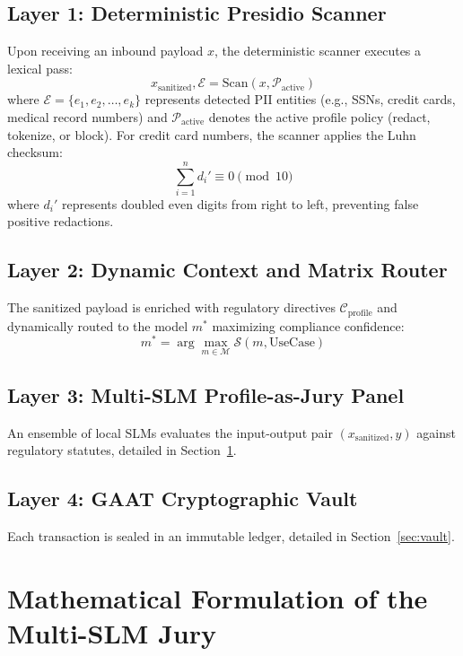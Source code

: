 \documentclass[conference,10pt]{IEEEtran}
\begin{document}
\subsection{Layer 1: Deterministic Presidio Scanner}
Upon receiving an inbound payload $x$, the deterministic scanner executes a lexical pass:
\begin{equation}
    x_{\text{sanitized}}, \mathcal{E} = \text{Scan}(x, \mathcal{P}_{\text{active}})
\end{equation}
where $\mathcal{E} = \{e_1, e_2, \dots, e_k\}$ represents detected PII entities (e.g., SSNs, credit cards, medical record numbers) and $\mathcal{P}_{\text{active}}$ denotes the active profile policy (redact, tokenize, or block). For credit card numbers, the scanner applies the Luhn checksum:
\begin{equation}
    \sum_{i=1}^{n} d_i' \equiv 0 \pmod{10}
\end{equation}
where $d_i'$ represents doubled even digits from right to left, preventing false positive redactions.

\subsection{Layer 2: Dynamic Context and Matrix Router}
The sanitized payload is enriched with regulatory directives $\mathcal{C}_{\text{profile}}$ and dynamically routed to the model $m^*$ maximizing compliance confidence:
\begin{equation}
    m^* = \arg\max_{m \in \mathcal{M}} \mathcal{S}(m, \text{UseCase})
\end{equation}

\subsection{Layer 3: Multi-SLM Profile-as-Jury Panel}
An ensemble of local SLMs evaluates the input-output pair $(x_{\text{sanitized}}, y)$ against regulatory statutes, detailed in Section~\ref{sec:jury}.

\subsection{Layer 4: GAAT Cryptographic Vault}
Each transaction is sealed in an immutable ledger, detailed in Section~\ref{sec:vault}.

\section{Mathematical Formulation of the Multi-SLM Jury}
\label{sec:jury}
\end{document}
